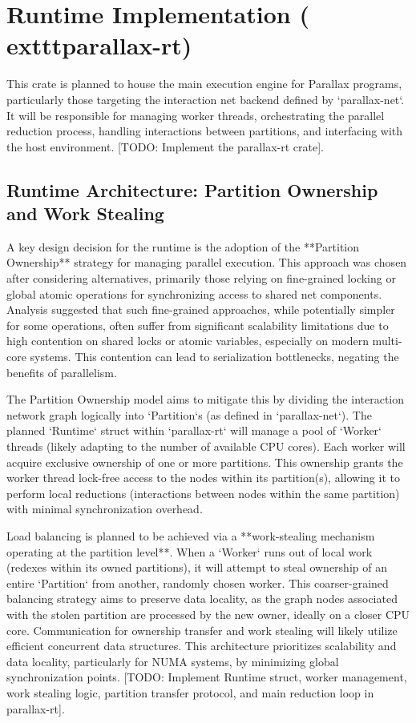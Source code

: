 \section{Runtime Implementation (	exttt{parallax-rt})} %
This crate is planned to house the main execution engine for Parallax programs, particularly those targeting the interaction net backend defined by `parallax-net`. It will be responsible for managing worker threads, orchestrating the parallel reduction process, handling interactions between partitions, and interfacing with the host environment. [TODO: Implement the parallax-rt crate].

\subsection{Runtime Architecture: Partition Ownership and Work Stealing}
A key design decision for the runtime is the adoption of the **Partition Ownership** strategy for managing parallel execution. This approach was chosen after considering alternatives, primarily those relying on fine-grained locking or global atomic operations for synchronizing access to shared net components. Analysis suggested that such fine-grained approaches, while potentially simpler for some operations, often suffer from significant scalability limitations due to high contention on shared locks or atomic variables, especially on modern multi-core systems. This contention can lead to serialization bottlenecks, negating the benefits of parallelism.

The Partition Ownership model aims to mitigate this by dividing the interaction network graph logically into `Partition`s (as defined in `parallax-net`). The planned `Runtime` struct within `parallax-rt` will manage a pool of `Worker` threads (likely adapting to the number of available CPU cores). Each worker will acquire exclusive ownership of one or more partitions. This ownership grants the worker thread lock-free access to the nodes within its partition(s), allowing it to perform local reductions (interactions between nodes within the same partition) with minimal synchronization overhead.

Load balancing is planned to be achieved via a **work-stealing mechanism operating at the partition level**. When a `Worker` runs out of local work (redexes within its owned partitions), it will attempt to steal ownership of an entire `Partition` from another, randomly chosen worker. This coarser-grained balancing strategy aims to preserve data locality, as the graph nodes associated with the stolen partition are processed by the new owner, ideally on a closer CPU core. Communication for ownership transfer and work stealing will likely utilize efficient concurrent data structures. This architecture prioritizes scalability and data locality, particularly for NUMA systems, by minimizing global synchronization points. [TODO: Implement Runtime struct, worker management, work stealing logic, partition transfer protocol, and main reduction loop in parallax-rt].


